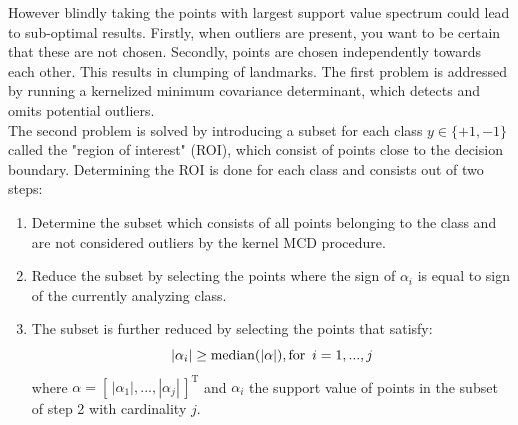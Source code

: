 \documentclass[preprint,12pt]{elsarticle}
\begin{document}
	However blindly taking the points with largest support value spectrum could lead to sub-optimal results. Firstly, when outliers are present, you want to be certain that these are not chosen. Secondly, points are chosen independently towards each other. This results in clumping of landmarks. The first problem is addressed by running a kernelized minimum covariance determinant, which detects and omits potential outliers.  \\
	
	The second problem is solved by introducing a subset for each class \newline $y \in \{+1,-1\}$ called the "region of interest" (ROI), which consist of points close to the decision boundary. Determining the ROI is done for each class and consists out of two steps:
	\begin{enumerate}
		\item Determine the subset which consists of all points belonging to the class and are not considered outliers by the kernel MCD procedure.
		\item Reduce the subset by selecting the points where the sign of $\alpha_i$ is equal to sign of the currently analyzing class.
		\item The subset is further reduced by selecting the points that satisfy:
		\begin{equation}
			|\alpha_i| \geq \mathrm{median}(|\alpha|), \mathrm{for} \enskip i = 1,...,j
		\end{equation}
		 where $\alpha = [\,|\alpha_1|,...,|\alpha_j|\,]^{\mathrm{T}}$ and $\alpha_i$ the support value of points in the subset of step 2 with cardinality $j$.
	\end{enumerate}
\end{document}
